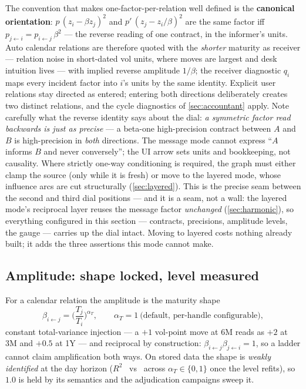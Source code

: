 \documentclass[11pt]{article}
\begin{document}
The convention that makes one-factor-per-relation well defined is the
\textbf{canonical orientation}: $p\,(z_i-\beta z_j)^2$ and
$p'\,(z_j-z_i/\beta)^2$ are the same factor iff
$p_{j\leftarrow i}=p_{i\leftarrow j}\,\beta^2$ --- the reverse reading of
one contract, in the informer's units.  Auto calendar relations are
therefore quoted with the \emph{shorter} maturity as receiver --- relation
noise in short-dated vol units, where moves are largest and desk intuition
lives --- with implied reverse amplitude $1/\beta$; the receiver
diagnostic $q_i$ maps every incident factor into $i$'s units by the same
identity.  Explicit user relations stay directed as entered; entering both
directions deliberately creates two distinct relations, and the cycle
diagnostics of \cref{sec:accountant} apply.  Note carefully what the
reverse identity says about the dial: \emph{a symmetric factor read
backwards is just as precise} --- a beta-one high-precision contract
between $A$ and $B$ is high-precision in \emph{both} directions.  The
message mode cannot express ``$A$ informs $B$ and never conversely''; the
UI arrow sets units and bookkeeping, not causality.  Where strictly
one-way conditioning is required, the graph must either clamp the source
(only while it is fresh) or move to the layered mode, whose influence arcs
are cut structurally (\cref{sec:layered}).  This is the precise seam
between the second and third dial positions --- and it is a seam, not a
wall: the layered mode's reciprocal layer reuses the message factor
\emph{unchanged} (\cref{sec:harmonic}), so everything configured in this
section --- contracts, precisions, amplitude levels, the gauge --- carries
up the dial intact.  Moving to layered costs nothing already built; it
adds the three assertions this mode cannot make.

\subsection{Amplitude: shape locked, level measured}
\label{sec:amplitude}

For a calendar relation the amplitude is the maturity shape
\begin{equation}
\beta_{i\leftarrow j}=\Big(\frac{T_j}{T_i}\Big)^{\alpha_T},
\qquad \alpha_T=1\ \text{(default, per-handle configurable)},
\label{eq:beta}
\end{equation}
constant total-variance injection --- a $+1$ vol-point move at 6M reads as
$+2$ at 3M and $+0.5$ at 1Y --- and reciprocal by construction:
$\beta_{i\leftarrow j}\beta_{j\leftarrow i}=1$, so a ladder cannot claim
amplification both ways.  On stored data the shape is \emph{weakly
identified} at the day horizon ($R^2$ \gtpshaperzero\ vs \gtpshaperone\
across $\alpha_T\in\{0,1\}$ once the level refits), so $1.0$ is held by
its semantics and the adjudication campaigns sweep it.
\end{document}
